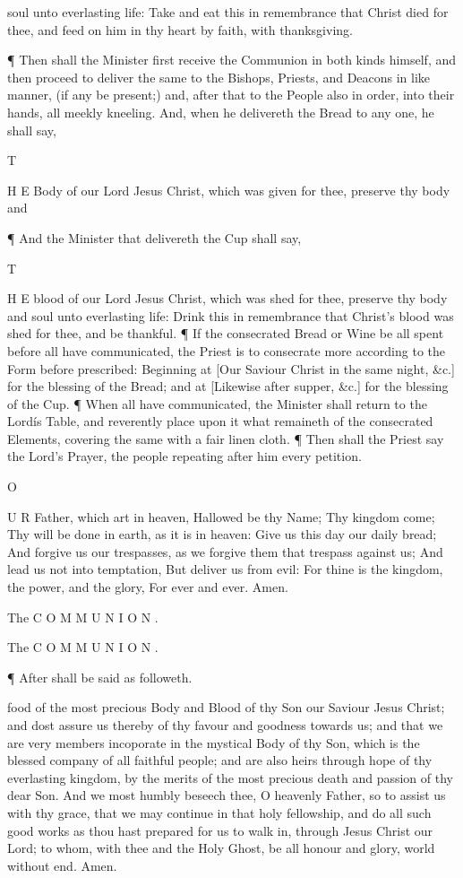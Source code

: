 soul unto everlasting life: Take and eat this in remembrance that Christ died for thee, and feed on him in thy heart by faith, with thanksgiving.

¶ Then shall the Minister first receive the Communion in both kinds himself, and then proceed to deliver the same to the Bishops, Priests, and Deacons in like manner, (if any be present;) and, after that to the People also in order, into their hands, all meekly kneeling. And, when he delivereth the Bread to any one, he shall say,

T

H E Body of our Lord Jesus Christ, which was given for thee, preserve thy body and

¶ And the Minister that delivereth the Cup shall say,

T

H E blood of our Lord Jesus Christ, which was shed for thee, preserve thy body and soul unto everlasting life: Drink this in remembrance that Christ’s blood was shed for thee, and be thankful. ¶ If the consecrated Bread or Wine be all spent before all have communicated, the Priest is to consecrate more according to the Form before prescribed: Beginning at [Our Saviour Christ in the same night, \&c.] for the blessing of the Bread; and at [Likewise after supper, \&c.] for the blessing of the Cup. ¶ When all have communicated, the Minister shall return to the Lordís Table, and reverently place upon it what remaineth of the consecrated Elements, covering the same with a fair linen cloth. ¶ Then shall the Priest say the Lord’s Prayer, the people repeating after him every petition.

O

U R Father, which art in heaven, Hallowed be thy Name; Thy kingdom come; Thy will be done in earth, as it is in heaven: Give us this day our daily bread; And forgive us our trespasses, as we forgive them that trespass against us; And lead us not into temptation, But deliver us from evil: For thine is the kingdom, the power, and the glory, For ever and ever. Amen.

The C O M M U N I O N .

The C O M M U N I O N .

¶ After shall be said as followeth.

food of the most precious Body and Blood of thy Son our Saviour Jesus Christ; and dost assure us thereby of thy favour and goodness towards us; and that we are very members incoporate in the mystical Body of thy Son, which is the blessed company of all faithful people; and are also heirs through hope of thy everlasting kingdom, by the merits of the most precious death and passion of thy dear Son. And we most humbly beseech thee, O heavenly Father, so to assist us with thy grace, that we may continue in that holy fellowship, and do all such good works as thou hast prepared for us to walk in, through Jesus Christ our Lord; to whom, with thee and the Holy Ghost, be all honour and glory, world without end. Amen.

